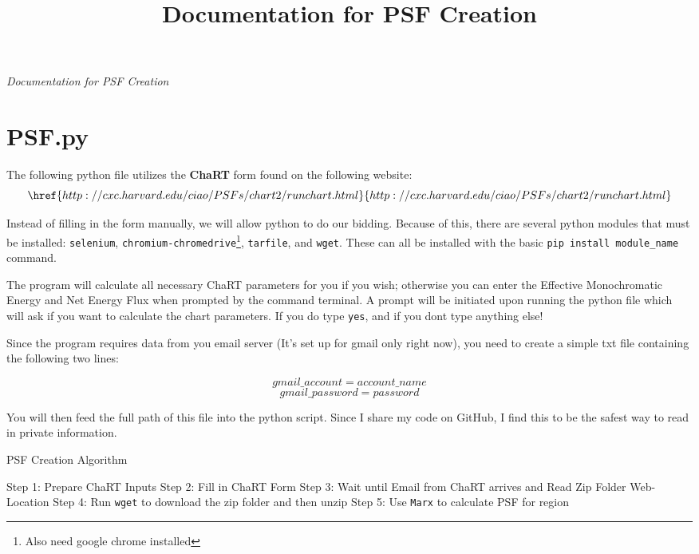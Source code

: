 \documentclass[11pt,letterpaper]{article}
\begin{document}
	\univlogo
	
	\title{Documentation for PSF Creation}
	
	\textit{Documentation for PSF Creation}
	
	\tableofcontents
	
	\newpage
	
	
	\newpage
\section{PSF.py}
The following python file utilizes the \textbf{ChaRT} form found on the following website:
$$\href{http://cxc.harvard.edu/ciao/PSFs/chart2/runchart.html}{http://cxc.harvard.edu/ciao/PSFs/chart2/runchart.html} $$

Instead of filling in the form manually, we will allow python to do our bidding. Because of this, there are several python modules that must be installed: \texttt{selenium}, \texttt{chromium-chromedrive}\footnote{Also need google chrome installed}, \texttt{tarfile}, and \texttt{wget}. These can all be installed with the basic \texttt{pip install module\_name} command. 

The program will calculate all necessary ChaRT parameters for you if you wish; otherwise you can enter the Effective Monochromatic Energy and Net Energy Flux when prompted by the command terminal. A prompt will be initiated upon running the python file which will ask if you want to calculate the chart parameters. If you do type \texttt{yes}, and if you dont type anything else! 

Since the program requires data from you email server (It's set up for gmail only right now), you need to create a simple txt file containing the following two lines:

$$gmail\_account = account\_name$$
$$gmail\_password = password$$

You will then feed the full path of this file into the python script. Since I share my code on GitHub, I find this to be the safest way to read in private information.

\begin{algorithm}[H]\label{algo:PSF}
	\caption{PSF Creation Algorithm}
	Step 1: Prepare ChaRT Inputs \;
	Step 2: Fill in ChaRT Form \;
	Step 3: Wait until Email from ChaRT arrives and Read Zip Folder Web-Location \; 
	Step 4: Run \texttt{wget} to download the zip folder and then unzip \;
	Step 5: Use \texttt{Marx} to calculate PSF for region \;
\end{algorithm}
\end{document}
